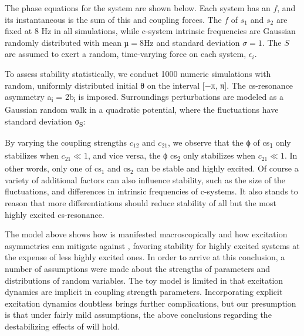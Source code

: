   The phase equations for the system are shown below. Each system has an  $f$, and its instantaneous  is the sum of this  and coupling forces. The $f$ of $s_1$ and $s_2$ are fixed at 8 Hz in all simulations, while c-system intrinsic frequencies are Gaussian randomly distributed with mean $µ = 8 \text{Hz}$ and standard deviation $σ = 1$. The  $S$ are assumed to exert a random, time-varying force on each system,  ${\epsilon} _{i}$. 


  To assess stability statistically, we conduct 1000 numeric simulations with random, uniformly distributed initial θ on the interval [−π, π]. The cs-resonance asymmetry a\textsubscript{i} = 2b\textsubscript{i} is imposed. Surroundings perturbations are modeled as a Gaussian random walk in a quadratic potential, where the fluctuations have standard deviation σ\textsubscript{S}:

 

  By varying the coupling strengths $c_{12}$ and $c_{21}$,  we observe that the ϕ of cs\textsubscript{1} only stabilizes when $c_{21} \ll 1$, and vice versa, the ϕ  cs\textsubscript{2} only stabilizes when $c_{21} \ll 1$. In other words, only one of $\text{cs}_{1}$ and $\text{cs}_{2}$ can be stable and highly excited. Of course a variety of additional factors can also influence stability, such as the size of the  fluctuations, and differences in intrinsic frequencies of c-systems. It also stands to reason that more differentiations should reduce stability of all but the most highly excited cs-resonance.

The model above shows how   is manifested macroscopically and how excitation asymmetries can mitigate against , favoring stability for highly excited systems at the expense of less highly excited ones. In order to arrive at this conclusion, a number of assumptions were made about the strengths of parameters and distributions of random variables. The toy model is limited in that excitation dynamics are implicit in coupling strength parameters. Incorporating explicit excitation dynamics doubtless brings further complications, but our presumption is that under fairly mild assumptions, the above conclusions regarding the destabilizing effects of  will hold.

